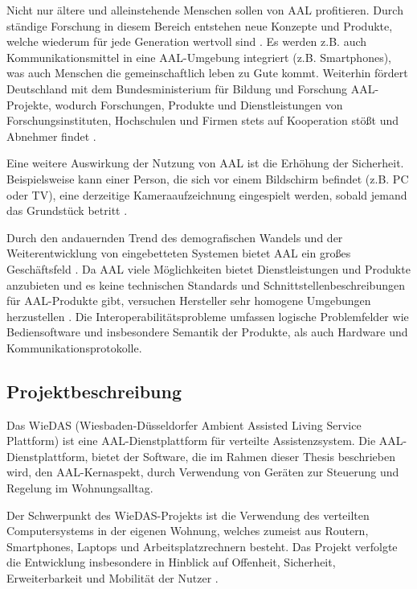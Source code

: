 Nicht nur ältere und alleinstehende Menschen sollen von AAL profitieren.
Durch ständige Forschung in diesem Bereich entstehen neue Konzepte und Produkte, welche wiederum
für jede Generation wertvoll sind \cite{mtidw}.
Es werden z.B. auch Kommunikationsmittel in eine AAL-Umgebung integriert (z.B. Smartphones), was
auch Menschen die gemeinschaftlich leben zu Gute kommt.
Weiterhin fördert Deutschland mit dem Bundesministerium für Bildung und Forschung AAL-Projekte,
wodurch Forschungen, Produkte und Dienstleistungen von Forschungsinstituten, Hochschulen und Firmen
stets auf Kooperation stößt und Abnehmer findet \cite{bmbf_aal}.

Eine weitere Auswirkung der Nutzung von AAL ist die Erhöhung der Sicherheit.
Beispielsweise kann einer Person, die sich vor einem Bildschirm befindet (z.B. PC oder TV),
eine derzeitige Kameraaufzeichnung eingespielt werden, sobald jemand das Grundstück betritt \cite{crestron}.

Durch den andauernden Trend des demografischen Wandels und der Weiterentwicklung von eingebetteten
Systemen bietet AAL ein großes Geschäftsfeld \cite{fhf_aal}.
Da AAL viele Möglichkeiten bietet Dienstleistungen und Produkte anzubieten und es keine technischen Standards
und Schnittstellenbeschreibungen für AAL-Produkte gibt, versuchen Hersteller sehr homogene Umgebungen
herzustellen \cite{aal_interop}.
Die Interoperabilitätsprobleme umfassen logische Problemfelder wie Bediensoftware und insbesondere Semantik
der Produkte, als auch Hardware und Kommunikationsprotokolle.

\subsection{Projektbeschreibung}
\label{gru_wiedas}

Das WieDAS (Wiesbaden-Düsseldorfer Ambient Assisted Living Service Plattform) ist eine AAL-Dienstplattform
für verteilte Assistenzsystem.
Die AAL-Dienstplattform, bietet der Software, die im Rahmen dieser Thesis beschrieben wird, den AAL-Kernaspekt,
durch Verwendung von Geräten zur Steuerung und Regelung im Wohnungsalltag.

Der Schwerpunkt des WieDAS-Projekts ist die Verwendung des verteilten Computersystems in der eigenen Wohnung,
welches zumeist aus Routern, Smartphones, Laptops und Arbeitsplatzrechnern besteht.
Das Projekt verfolgte die Entwicklung insbesondere in Hinblick auf Offenheit, Sicherheit, Erweiterbarkeit
und Mobilität der Nutzer \cite{wiedas}.

